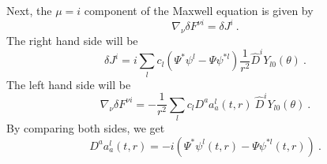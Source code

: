\documentclass[a4paper,11pt]{article}
\begin{document}
    Next, the $\mu=i$ component of the Maxwell equation is given by
    \begin{equation}
        \nabla_\nu\delta F^{\nu i}= \delta J^i\ .
    \end{equation}
    The right hand side will be 
    \begin{equation}
        \delta J^i
        =i \sum_l c_l \left(\Psi^*\psi^l-\Psi\psi^{*l}\right)\frac{1}{r^2}\hat{D}^i Y_{l0}(\theta)\ .
    \end{equation}
    The left hand side will be
    \begin{equation}
        \nabla_\nu\delta F^{\nu i}=-\frac{1}{r^2}  \sum_l c_l D^a a^l_a(t,r)\ \hat{D}^i Y_{l0}(\theta)\ .
    \end{equation}
    By comparing both sides, we get
    \begin{equation}
    \label{eq:Maxwell_i}
        D^a a^l_a(t,r) = -i\left(\Psi^*\psi^l(t,r)-\Psi\psi^{*l}(t,r)\right)\ .
    \end{equation}
\end{document}

